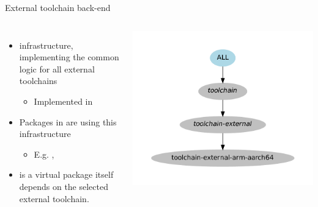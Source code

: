 \begin{frame}{External toolchain back-end}
  \begin{columns}
    \begin{itemize}
    \item {} infrastructure, implementing
      the common logic for all external toolchains
      \begin{itemize}
      \item Implemented in 
      \end{itemize}
    \item Packages in  are using
      this infrastructure
      \begin{itemize}
      \item E.g. ,
      \end{itemize}
    \item {} is a virtual package itself
      depends on the selected external toolchain.
    \end{itemize}
    \includegraphics[width=\textwidth]{slides/buildroot-internals/external-toolchain-graph-depends.pdf}
  \end{columns}
\end{frame}

